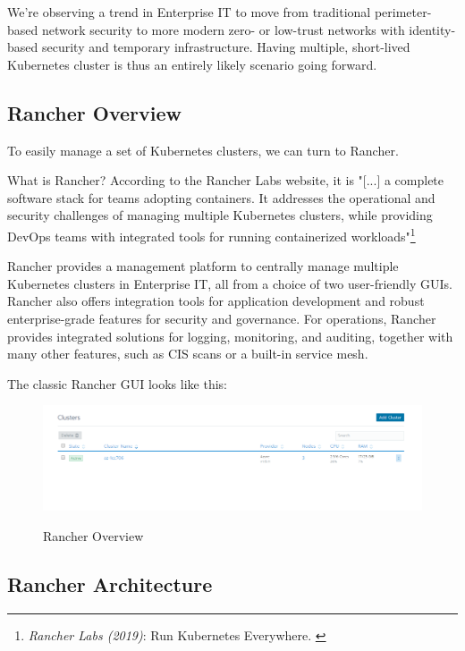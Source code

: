 We're observing a trend in Enterprise IT to move from traditional perimeter-based network security to more modern zero- or low-trust networks with identity-based security and temporary infrastructure. Having multiple, short-lived Kubernetes cluster is thus an entirely likely scenario going forward.

\subsection{Rancher Overview}

To easily manage a set of Kubernetes clusters, we can turn to Rancher.

What is Rancher? According to the Rancher Labs website, it is "[...] a complete software stack for teams adopting containers. It addresses the operational and security challenges of managing multiple Kubernetes clusters, while providing DevOps teams with integrated tools for running containerized workloads"\footnote{\textit{Rancher Labs (2019)}: Run Kubernetes Everywhere. \cite{rancher}}

Rancher provides a management platform to centrally manage multiple Kubernetes clusters in Enterprise IT, all from a choice of two user-friendly GUIs. Rancher also offers integration tools for application development and robust enterprise-grade features for security and governance. For operations, Rancher provides integrated solutions for logging, monitoring, and auditing, together with many other features, such as CIS scans or a built-in service mesh.

The classic Rancher GUI looks like this:

\begin{figure}[H]
\centering
\caption {Rancher Overview}
\includegraphics[width=\linewidth]{images/cluster-overview.png}
\label{fig:rancherOverview}
\end{figure}

\subsection{Rancher Architecture}

